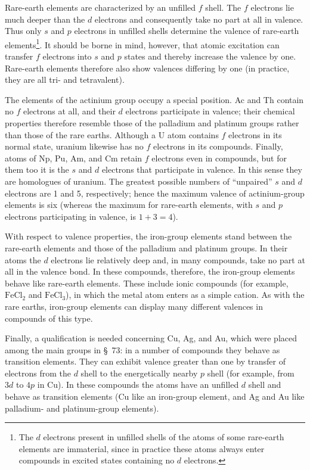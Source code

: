 Rare-earth elements are characterized by an unfilled $f$ shell. The $f$ electrons lie much
deeper than the $d$ electrons and consequently take no part at all in valence. Thus only $s$ and $p$ electrons in unfilled shells determine the valence of rare-earth elements\footnote{The $d$ electrons present in unfilled shells of the atoms of some rare-earth elements are immaterial, since in practice these atoms always enter compounds in excited states containing no $d$ electrons.}. It should be borne in mind, however, that atomic excitation can transfer $f$ electrons into $s$ and $p$ states and thereby increase the valence by one. Rare-earth elements therefore also show valences differing by one (in practice, they are all tri- and tetravalent).

The elements of the actinium group occupy a special position. Ac and Th contain no $f$ electrons at all, and their $d$ electrons participate in valence; their chemical properties therefore resemble those of the palladium and platinum groups rather than those of the rare earths. Although a U atom contains $f$ electrons in its normal state, uranium likewise has no $f$ electrons in its compounds. Finally, atoms of Np, Pu, Am, and Cm retain $f$ electrons even in compounds, but for them too it is the $s$ and $d$ electrons that participate in valence. In this sense they are homologues of uranium. The greatest possible numbers of ``unpaired'' $s$ and $d$ electrons are 1 and 5, respectively; hence the maximum valence of actinium-group elements is six (whereas the maximum for rare-earth elements, with $s$ and $p$ electrons participating in valence, is $1+3=4$).

With respect to valence properties, the iron-group elements stand between the rare-earth elements and those of the palladium and platinum groups. In their atoms the $d$ electrons lie relatively deep and, in many compounds, take no part at all in the valence bond. In these compounds, therefore, the iron-group elements behave like rare-earth elements. These include ionic compounds (for example, $\mathrm{FeCl}_2$ and $\mathrm{FeCl}_3$), in which the metal atom enters as a simple cation. As with the rare earths, iron-group elements can display many different valences in compounds of this type.



Finally, a qualification is needed concerning Cu, Ag, and Au, which were placed among the main groups in \S~73: in a number of compounds they behave as transition elements. They can exhibit valence greater than one by transfer of electrons from the $d$ shell to the energetically nearby $p$ shell (for example, from $3d$ to $4p$ in Cu). In these compounds the atoms have an unfilled $d$ shell and behave as transition elements (Cu like an iron-group element, and Ag and Au like palladium- and platinum-group elements).

